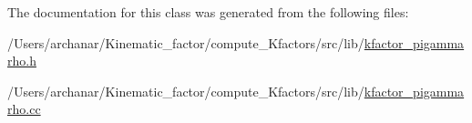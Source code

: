 The documentation for this class was generated from the following files\+:\begin{DoxyCompactItemize}
\item 
/\+Users/archanar/\+Kinematic\+\_\+factor/compute\+\_\+\+Kfactors/src/lib/\mbox{\hyperlink{kfactor__pigammarho_8h}{kfactor\+\_\+pigammarho.\+h}}\item 
/\+Users/archanar/\+Kinematic\+\_\+factor/compute\+\_\+\+Kfactors/src/lib/\mbox{\hyperlink{kfactor__pigammarho_8cc}{kfactor\+\_\+pigammarho.\+cc}}\end{DoxyCompactItemize}
